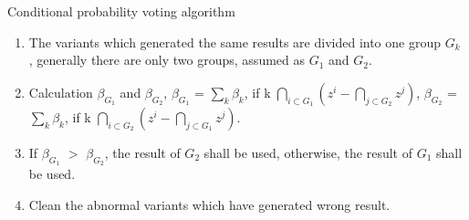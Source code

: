 \documentclass{beamer}
\begin{document}
\begin{frame}{Conditional probability voting algorithm}
    \begin{block}{}
        \begin{enumerate}
            \item  The variants which generated the same results are divided into one group $G_k$ , generally there are only two groups, assumed as $G_1$ and $G_2$.
            \item Calculation $\beta_{G_1}$ and $\beta_{G_2}$, $\beta_{G_1}$ = $\sum_{k}^{} \beta_k$, if k \in $ \bigcap\limits_{i \subset G_1}^{}(z^i-\bigcap\limits_{j \subset G_2}^{}z^j)$, $\beta_{G_2}$ = $\sum_{k}^{} \beta_k$, if k \in $ \bigcap\limits_{i \subset G_2}^{}(z^i-\bigcap\limits_{j \subset G_1}^{}z^j)$.
            \item If $\beta_{G_1}$ $>$ $\beta_{G_2}$, the result of $G_2$ shall be used, otherwise, the result of $G_1$ shall be used.
            \item Clean the abnormal variants which have generated wrong result.
        \end{enumerate}
    \end{block}
\end{frame}
\end{document}
